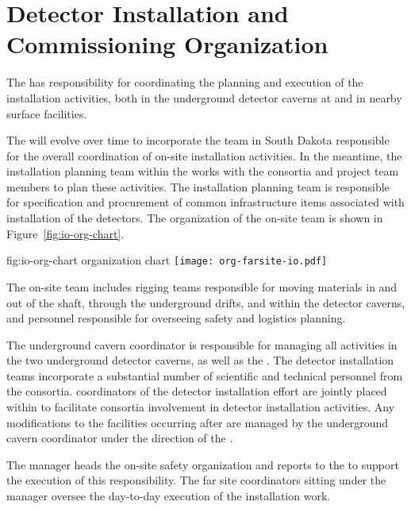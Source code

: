 \section{Detector Installation and Commissioning Organization}  %
\label{sec:es-tc-det-instal}

The  has
responsibility for coordinating the planning and execution of 
the  installation activities, both 
in the underground detector caverns at  and in 
nearby surface facilities. 

The   will evolve over 
time to incorporate the team in South Dakota responsible for the 
overall coordination of on-site installation activities.  In the 
meantime, the installation planning team within the  works with 
the  consortia and  project team members 
to plan these activities.  
The  installation planning team is responsible for specification 
and procurement of common infrastructure items associated with 
installation of the detectors. 
The organization of the on-site team is 
shown in Figure~\ref{fig:io-org-chart}. 
\begin{dunefigure}{fig:io-org-chart}
  { organization chart}
  \texttt{[image: org-farsite-io.pdf]}
\end{dunefigure}


The on-site  team includes rigging teams responsible for moving 
materials in and out of the shaft, through the underground drifts, 
and within the detector caverns, and personnel responsible 
for overseeing safety and logistics planning. 

The underground cavern coordinator is responsible for managing all 
activities in the two underground detector caverns, as well as the
. The detector
installation teams incorporate a substantial number of scientific and
technical personnel from the  consortia.   coordinators 
of the detector installation effort are jointly placed within 
  to facilitate consortia involvement in  
detector installation activities.  Any modifications to the facilities 
occurring after  are managed by the underground cavern 
coordinator under the direction of the .

The 
 manager heads the on-site safety organization and reports
to the  to support the execution of this
responsibility. The far site  coordinators sitting under the
  manager oversee the day-to-day execution
of the installation work.

